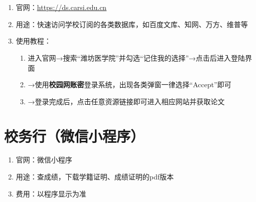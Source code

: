 \section[CARSI系统]{\textbf{}}
\label{carsi_system}
\begin{enumerate}
    \item 官网：\uline{\href{https://ds.carsi.edu.cn}{https://ds.carsi.edu.cn}}
    \item 用途：快速访问学校订阅的各类数据库，如百度文库、知网、万方、维普等
    \item 使用教程：
          \begin{enumerate}
              \item 进入官网→搜索“潍坊医学院”并勾选“记住我的选择”→点击后进入登陆界面\footnotemark
              \item →使用\textbf{校园网账密}登录系统，出现各类弹窗一律选择“Accept”即可\footnotemark
              \item →登录完成后，点击任意资源链接即可进入相应网站并获取论文
          \end{enumerate}
\end{enumerate}

\section[校务行（微信小程序）]{校务行（微信小程序）}
\begin{enumerate}
    \item 官网：微信小程序
    \item 用途：查成绩，下载学籍证明、成绩证明的pdf版本
    \item 费用：以程序显示为准
\end{enumerate}

